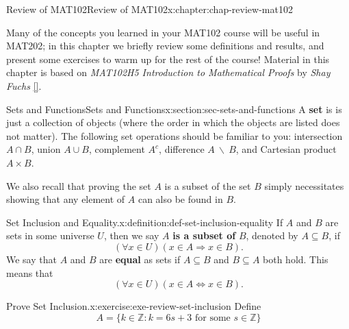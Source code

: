 \documentclass[oneside,10pt,]{book}
\newcommand{\xreffont}{\relax}
\newcommand{\terminology}[1]{\textbf{#1}}
\newcommand{\pubtitle}[1]{\textsl{#1}}
\numberwithin{equation}{section}
\begin{document}
\typeout{************************************************}
%
\begin{chapterptx}{Review of MAT102}{}{Review of MAT102}{}{}{x:chapter:chap-review-mat102}
\begin{introduction}{}%
Many of the concepts you learned in your MAT102 course will be useful in MAT202; in this chapter we briefly review some definitions and results, and present some exercises to warm up for the rest of the course! Material in this chapter is based on \pubtitle{MAT102H5 Introduction to Mathematical Proofs} by \emph{Shay Fuchs} \hyperlink{x:biblio:bib-fuchs-102}{[{\xreffont 3}]}.%
\end{introduction}%
%
%
\typeout{************************************************}
\typeout{************************************************}
%
\begin{sectionptx}{Sets and Functions}{}{Sets and Functions}{}{}{x:section:sec-sets-and-functions}
A \terminology{set} is is just a collection of objects (where the order in which the objects are listed does not matter). The following set operations should be familiar to you: intersection \(A \cap B\), union \(A \cup B\), complement \(A^c\), difference \(A \ \backslash \ B\), and Cartesian product \(A \times B\).%
\par
We also recall that proving the set \(A\) is a subset of the set \(B\) simply necessitates showing that any element of \(A\) can also be found in \(B\).%
\begin{definition}{Set Inclusion and Equality.}{x:definition:def-set-inclusion-equality}%
\label{g:notation:id521014} If \(A\) and \(B\) are sets in some universe \(U\), then we say \(A\) \terminology{is a subset of} \(B\), denoted by \(A \subseteq B\), if%
\begin{equation*}
(\forall x \in U)(x \in A \Rightarrow x \in B)\text{.}
\end{equation*}
We say that \(A\) and \(B\) are \terminology{equal} as sets if \(A \subseteq B\) and \(B \subseteq A\) both hold. This means that%
\begin{equation*}
(\forall x \in U)(x \in A \Leftrightarrow x \in B)\text{.}
\end{equation*}
%
\end{definition}
\begin{inlineexercise}{Prove Set Inclusion.}{x:exercise:exe-review-set-inclusion}%
Define%
\begin{equation*}
A = \{k \in \mathbb{Z} : k = 6s + 3 \text{ for some } s \in \mathbb{Z}\}

\end{equation*}
\end{inlineexercise}
\end{sectionptx}
\end{chapterptx}
\end{document}

